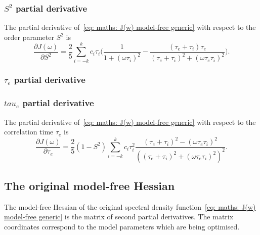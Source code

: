 \subsubsection{$S^2$ partial derivative}

The partial derivative of~\eqref{eq: maths: J(w) model-free generic} with respect to the order parameter $S^2$ is
\begin{equation}
    \frac{\partial J(\omega)}{\partial S^2} = \frac{2}{5} \sum_{i=-k}^k c_i \tau_i \Bigg(
        \frac{1}{1 + (\omega \tau_i)^2}
        - \frac{(\tau_e + \tau_i)\tau_e}{(\tau_e + \tau_i)^2 + (\omega \tau_e \tau_i)^2}
    \Bigg).
\end{equation}



\begin{latexonly}
    \subsubsection{$\tau_e$ partial derivative}
\end{latexonly}
\begin{htmlonly}
    \subsubsection{$tau_e$ partial derivative}
\end{htmlonly}

The partial derivative of~\eqref{eq: maths: J(w) model-free generic} with respect to the correlation time $\tau_e$ is
\begin{equation}
    \frac{\partial J(\omega)}{\partial \tau_e} = \frac{2}{5} (1 - S^2) \sum_{i=-k}^k c_i \tau_i^2
        \frac{(\tau_e + \tau_i)^2 - (\omega \tau_e \tau_i)^2}{\left((\tau_e + \tau_i)^2 + (\omega \tau_e \tau_i)^2 \right)^2}.
\end{equation}




\newpage
\subsection{The original model-free Hessian}

The model-free Hessian of the original spectral density function~\eqref{eq: maths: J(w) model-free generic} is the matrix of second partial derivatives.  The matrix coordinates correspond to the model parameters which are being optimised.



